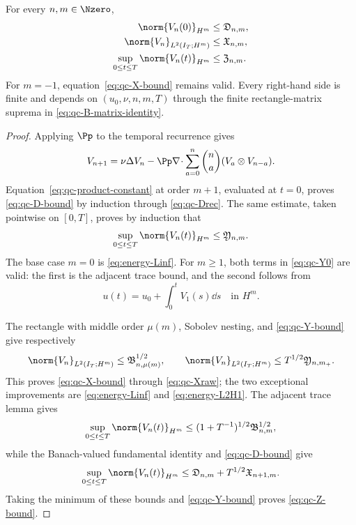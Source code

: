 \begin{lemma}
\label{lem:qc-closed-velocity-majorants}
For every \(n,m\in\Nzero\),
\begin{align}
 \norm{V_n(0)}_{H^m}&\le\mathfrak D_{n,m},
 \label{eq:qc-D-bound}\\
 \norm{V_n}_{L^2(I_T;H^m)}&\le\mathfrak X_{n,m},
 \label{eq:qc-X-bound}\\
 \sup_{0\le t\le T}\norm{V_n(t)}_{H^m}
 &\le\mathfrak Z_{n,m}.
 \label{eq:qc-Z-bound}
\end{align}
For \(m=-1\), equation~\eqref{eq:qc-X-bound} remains valid.  Every
right-hand side is finite and depends on \((u_0,\nu,n,m,T)\) through the
finite rectangle-matrix suprema in \eqref{eq:qc-B-matrix-identity}.
\end{lemma}

\begin{proof}
Applying \(\Pp\) to the temporal recurrence gives
\begin{equation}
 V_{n+1}=\nu\Delta V_n
 -\Pp\nabla\!\cdot\sum_{a=0}^{n}\binom na
 (V_a\otimes V_{n-a}).
 \label{eq:qc-projected-temporal-recurrence}
\end{equation}
Equation~\eqref{eq:qc-product-constant} at order \(m+1\), evaluated at
\(t=0\), proves \eqref{eq:qc-D-bound} by induction through
\eqref{eq:qc-Drec}.  The same estimate, taken pointwise on \([0,T]\),
proves by induction that
\begin{equation}
 \sup_{0\le t\le T}\norm{V_n(t)}_{H^m}
 \le\mathfrak Y_{n,m}.
 \label{eq:qc-Y-bound}
\end{equation}
The base case \(m=0\) is \eqref{eq:energy-Linf}.  For \(m\ge1\), both
terms in \eqref{eq:qc-Y0} are valid: the first is the adjacent trace bound,
and the second follows from
\[
 u(t)=u_0+\int_0^tV_1(s)\dd s
 \quad\text{in }H^m.
\]

The rectangle with middle order \(\mu(m)\), Sobolev nesting, and
\eqref{eq:qc-Y-bound} give respectively
\[
 \norm{V_n}_{L^2(I_T;H^m)}
 \le\mathfrak B_{n,\mu(m)}^{1/2},
 \qquad
 \norm{V_n}_{L^2(I_T;H^m)}
 \le T^{1/2}\mathfrak Y_{n,m_+}.
\]
This proves \eqref{eq:qc-X-bound} through \eqref{eq:qc-Xraw}; the two
exceptional improvements are \eqref{eq:energy-Linf} and
\eqref{eq:energy-L2H1}.  The adjacent trace lemma gives
\[
 \sup_{0\le t\le T}\norm{V_n(t)}_{H^m}
 \le(1+T^{-1})^{1/2}\mathfrak B_{n,m}^{1/2},
\]
while the Banach-valued fundamental identity and
\eqref{eq:qc-D-bound} give
\[
 \sup_{0\le t\le T}\norm{V_n(t)}_{H^m}
 \le\mathfrak D_{n,m}+T^{1/2}\mathfrak X_{n+1,m}.
\]
Taking the minimum of these bounds and \eqref{eq:qc-Y-bound} proves
\eqref{eq:qc-Z-bound}.
\end{proof}

